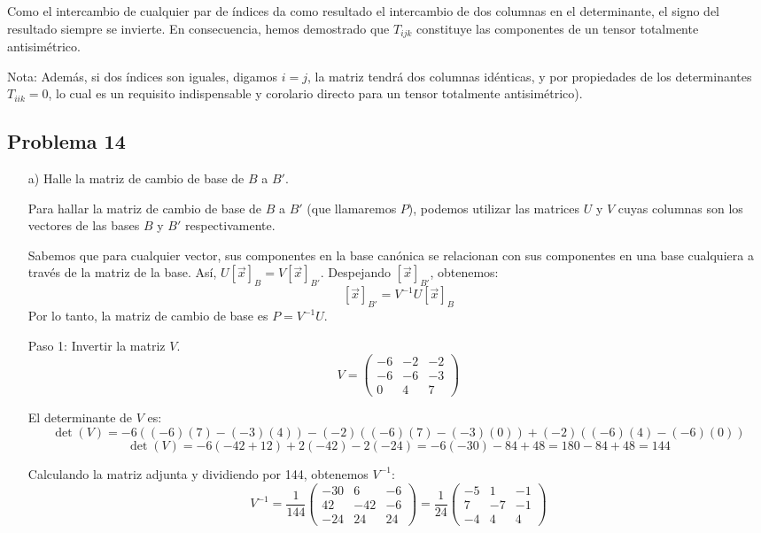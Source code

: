 \documentclass[11pt,spanish]{article}
\begin{document}
Como el intercambio de cualquier par de índices da como resultado el intercambio de dos columnas en el determinante, el signo del resultado siempre se invierte. En consecuencia, hemos demostrado que $T_{ijk}$ constituye las componentes de un tensor totalmente antisimétrico. 

Nota: Además, si dos índices son iguales, digamos $i=j$, la matriz tendrá dos columnas idénticas, y por propiedades de los determinantes $T_{iik} = 0$, lo cual es un requisito indispensable y corolario directo para un tensor totalmente antisimétrico).

\subsection*{Problema 14}

\begin{itemize}
\item[a)] Halle la matriz de cambio de base de $B$ a $B'$.

Para hallar la matriz de cambio de base de $B$ a $B'$ (que llamaremos $P$), podemos utilizar las matrices $U$ y $V$ cuyas columnas son los vectores de las bases $B$ y $B'$ respectivamente. 

Sabemos que para cualquier vector, sus componentes en la base canónica se relacionan con sus componentes en una base cualquiera a través de la matriz de la base. Así, $U [\vec{x}]_B = V [\vec{x}]_{B'}$.
Despejando $[\vec{x}]_{B'}$, obtenemos:
$$[\vec{x}]_{B'} = V^{-1} U [\vec{x}]_B$$
Por lo tanto, la matriz de cambio de base es $P = V^{-1} U$.

Paso 1: Invertir la matriz $V$.
$$V = \begin{pmatrix} -6 & -2 & -2 \\ -6 & -6 & -3 \\ 0 & 4 & 7 \end{pmatrix}$$

El determinante de $V$ es:
$$\det(V) = -6((-6)(7) - (-3)(4)) - (-2)((-6)(7) - (-3)(0)) + (-2)((-6)(4) - (-6)(0))$$
$$\det(V) = -6(-42 + 12) + 2(-42) - 2(-24) = -6(-30) - 84 + 48 = 180 - 84 + 48 = 144$$

Calculando la matriz adjunta y dividiendo por 144, obtenemos $V^{-1}$:
$$V^{-1} = \frac{1}{144} \begin{pmatrix} -30 & 6 & -6 \\ 42 & -42 & -6 \\ -24 & 24 & 24 \end{pmatrix} = \frac{1}{24} \begin{pmatrix} -5 & 1 & -1 \\ 7 & -7 & -1 \\ -4 & 4 & 4 \end{pmatrix}$$


\end{itemize}
\end{document}
